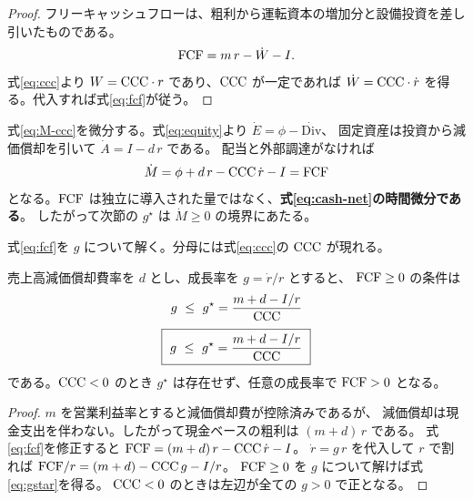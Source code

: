 \begin{proof}
フリーキャッシュフローは、粗利から運転資本の増加分と設備投資を差し引いたものである。
\[
\FCF = m\,r - \dot{W} - I .
\]
式\eqref{eq:ccc}より $W=\mathrm{CCC}\cdot r$ であり、$\mathrm{CCC}$ が一定であれば
$\dot W = \CCC\cdot\dot r$ を得る。代入すれば式\eqref{eq:fcf}が従う。
\end{proof}

\begin{remark}
\label{rem:fcf-is-mdot}
式\eqref{eq:M-ccc}を微分する。式\eqref{eq:equity}より $\dot E=\phi-\dot{\mathrm{Div}}$、
固定資産は投資から減価償却を引いて $\dot A = I - d\,r$ である。
配当と外部調達がなければ
\[
\dot M = \phi + d\,r - \CCC\,\dot r - I = \FCF
\]
となる。$\mathrm{FCF}$ は独立に導入された量ではなく、\textbf{式\eqref{eq:cash-net}の時間微分である}。
したがって次節の $g^\star$ は $\dot M\geq 0$ の境界にあたる。
\end{remark}

式\eqref{eq:fcf}を $g$ について解く。分母には式\eqref{eq:ccc}の $\mathrm{CCC}$ が現れる。

\begin{corollary}[自己金融可能成長率]
\label{cor:gstar}
売上高減価償却費率を $d$ とし、成長率を $g=\dot r/r$ とすると、
$\mathrm{FCF}\geq 0$ の条件は
\ifdefined\HCode
{}%
\begin{equation}
g \ \leq\ g^{\star} = \frac{m + d - I/r}{\mathrm{CCC}}
\label{eq:gstar}
\end{equation}
\else
\begin{equation}
\boxed{\ g \ \leq\ g^{\star} = \frac{m + d - I/r}{\CCC}\ }
\label{eq:gstar}
\end{equation}
\fi
である。$\mathrm{CCC}<0$ のとき $g^\star$ は存在せず、任意の成長率で $\mathrm{FCF}>0$ となる。
\end{corollary}

\begin{proof}
$m$ を営業利益率とすると減価償却費が控除済みであるが、
減価償却は現金支出を伴わない。したがって現金ベースの粗利は $(m+d)\,r$ である。
式\eqref{eq:fcf}を修正すると
$\FCF = (m+d)\,r - \CCC\,\dot r - I$。
$\dot r = g\,r$ を代入して $r$ で割れば
$\mathrm{FCF}/r = (m+d) - \mathrm{CCC}\,g - I/r$。
$\mathrm{FCF}\geq 0$ を $g$ について解けば式\eqref{eq:gstar}を得る。
$\mathrm{CCC}<0$ のときは左辺が全ての $g>0$ で正となる。
\end{proof}

